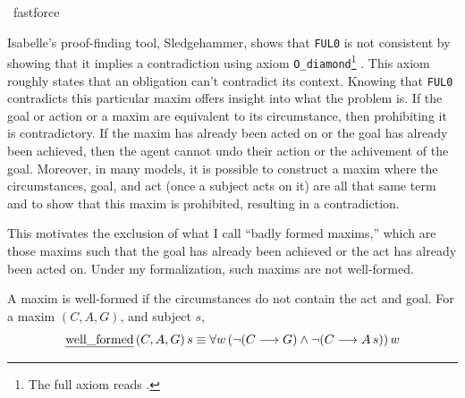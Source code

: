 \begin{isabellebody}
\ fastforce%
\endisatagproof
{\isafoldproof}%
%
\isadelimproof
%
\endisadelimproof
%
\begin{isamarkuptext}%
Isabelle's proof-finding tool, Sledgehammer, shows that 
\texttt{FUL0} is not consistent by showing that it implies a contradiction 
using axiom \texttt{O\_diamond}\footnote{The full axiom reads .} \citep{sledgehammer}. 
This axiom roughly states that an obligation can't contradict its context. Knowing that \texttt{FUL0}
contradicts this particular maxim offers insight into what the problem is. If the goal or action
or a maxim are equivalent to its circumstance, then prohibiting it is contradictory. If the maxim has already been 
acted on or the goal has already been achieved, then the agent cannot undo their action or the achivement 
of the goal. Moreover, in many models, it is possible to construct a maxim where the circumstances, goal, 
and act (once a subject acts on it) are all that same term and to show that this maxim is prohibited,
resulting in a contradiction. 

This motivates the exclusion of what I call ``badly formed maxims,'' which are those maxims such that 
the goal has already been achieved or the act has already been acted on. Under my formalization, such maxims are
not well-formed. 

\begin{definition}
A maxim is well-formed if the circumstances do not contain the act and goal. For a maxim $(C, A, G)$, and subject $s$, 
$$ \text{\emph{well\_formed}} \, (C, A, G) \, s \equiv \forall w \, (\neg (C \longrightarrow G) \wedge \neg (C \longrightarrow A \, s)) \, w$$

\end{definition}


\end{isamarkuptext}
\end{isabellebody}
